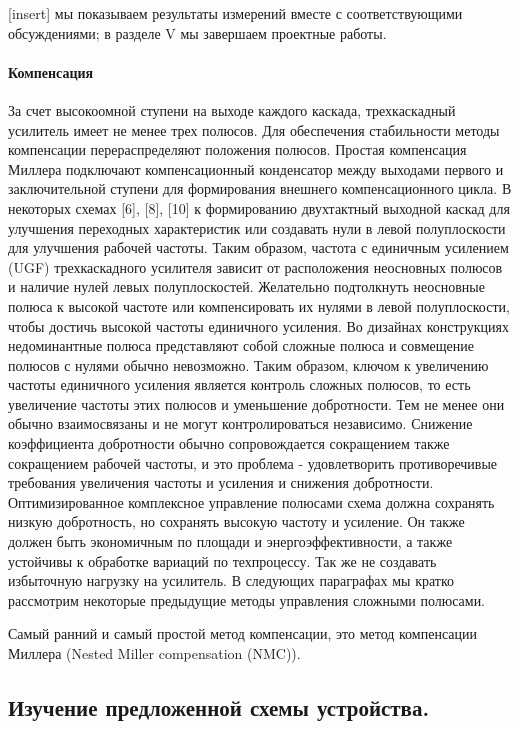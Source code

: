 \documentclass[a4paper,12pt]{article} %
\begin{document}
[insert] мы показываем результаты измерений вместе с соответствующими обсуждениями; в разделе V мы завершаем проектные работы.


\paragraph{Компенсация}

За счет высокоомной ступени на выходе каждого каскада,  трехкаскадный усилитель имеет не менее трех полюсов. Для обеспечения стабильности методы компенсации перераспределяют положения полюсов. Простая компенсация Миллера  подключают компенсационный конденсатор между выходами первого и заключительной ступени для формирования внешнего компенсационного цикла. В некоторых схемах [6], [8], [10] к формированию двухтактный выходной каскад для улучшения переходных характеристик или создавать нули в левой полуплоскости для улучшения рабочей частоты. Таким образом, частота с единичным усилением (UGF) трехкаскадного усилителя зависит от расположения неосновных полюсов и наличие нулей левых полуплоскостей. Желательно подтолкнуть неосновные полюса к высокой частоте или компенсировать их нулями в левой полуплоскости, чтобы достичь высокой частоты единичного усиления. Во  дизайнах конструкциях недоминантные полюса представляют собой сложные полюса и совмещение  полюсов с нулями обычно невозможно. Таким образом, ключом к увеличению частоты единичного усиления является контроль сложных полюсов, то есть увеличение частоты этих полюсов и уменьшение добротности. Тем не менее они обычно взаимосвязаны и не могут контролироваться независимо. Снижение коэффициента добротности  обычно сопровождается сокращением также сокращением рабочей частоты, и это проблема - удовлетворить противоречивые требования увеличения частоты и усиления и снижения добротности. Оптимизированное комплексное управление полюсами схема должна сохранять низкую добротность, но сохранять  высокую частоту и усиление. Он также должен быть экономичным по площади и энергоэффективности, а также устойчивы к обработке вариаций по техпроцессу. Так же не создавать избыточную нагрузку на усилитель. В следующих параграфах мы кратко рассмотрим некоторые предыдущие методы управления сложными полюсами. 


Самый ранний и самый простой метод компенсации, это метод компенсации Миллера (Nested Miller compensation (NMC)).



\subsection{Изучение предложенной схемы устройства.}
\end{document}
